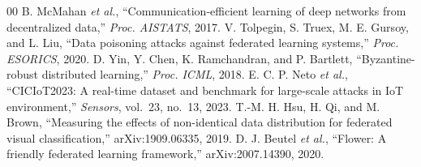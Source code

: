 \documentclass[journal]{IEEEtran}
\begin{document}
\footnotesize
\begin{thebibliography}{00}
\itemsep 0pt
 B. McMahan \emph{et al.}, ``Communication-efficient learning of deep networks from decentralized data,'' \emph{Proc. AISTATS}, 2017.
 V. Tolpegin, S. Truex, M. E. Gursoy, and L. Liu, ``Data poisoning attacks against federated learning systems,'' \emph{Proc. ESORICS}, 2020.
 D. Yin, Y. Chen, K. Ramchandran, and P. Bartlett, ``Byzantine-robust distributed learning,'' \emph{Proc. ICML}, 2018.
 E. C. P. Neto \emph{et al.}, ``CICIoT2023: A real-time dataset and benchmark for large-scale attacks in IoT environment,'' \emph{Sensors}, vol.~23, no.~13, 2023.
 T.-M. H. Hsu, H. Qi, and M. Brown, ``Measuring the effects of non-identical data distribution for federated visual classification,'' arXiv:1909.06335, 2019.
 D. J. Beutel \emph{et al.}, ``Flower: A friendly federated learning framework,'' arXiv:2007.14390, 2020.
\end{thebibliography}
\end{document}
